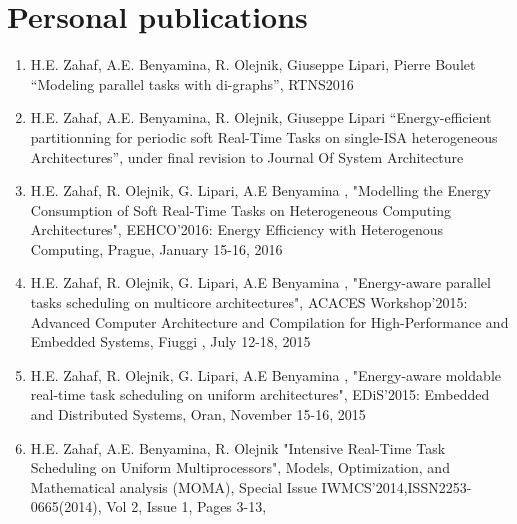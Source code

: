 
\chapter*{Personal publications}
\begin{enumerate}
\item H.E. Zahaf, A.E. Benyamina, R. Olejnik, Giuseppe Lipari, Pierre Boulet
  ``Modeling parallel tasks with di-graphs'', RTNS2016 \cite{me1}

\item H.E. Zahaf, A.E. Benyamina, R. Olejnik, Giuseppe Lipari
  ``Energy-efficient partitionning for periodic soft Real-Time Tasks
  on single-ISA heterogeneous Architectures'', under final revision to
  Journal Of System Architecture \cite{me2}

\item H.E. Zahaf, R. Olejnik, G. Lipari, A.E Benyamina , "Modelling
  the Energy Consumption of Soft Real-Time Tasks on Heterogeneous
  Computing Architectures", EEHCO'2016: Energy Efficiency with
  Heterogenous Computing, Prague, January 15-16, 2016\cite{me3}

\item H.E. Zahaf, R. Olejnik, G. Lipari, A.E Benyamina , "Energy-aware
  parallel tasks scheduling on multicore architectures", ACACES
  Workshop'2015: Advanced Computer Architecture and Compilation for
  High-Performance and Embedded Systems, Fiuggi , July 12-18, 2015
  \cite{me4}
  
\item H.E. Zahaf, R. Olejnik, G. Lipari, A.E Benyamina , "Energy-aware
  moldable real-time task scheduling on uniform architectures",
  EDiS'2015: Embedded and Distributed Systems, Oran, November 15-16,
  2015 \cite{me5}
    
\item H.E. Zahaf, A.E. Benyamina, R. Olejnik "Intensive Real-Time Task
  Scheduling on Uniform Multiprocessors", Models, Optimization, and
  Mathematical analysis (MOMA), Special Issue
  IWMCS'2014,ISSN2253-0665(2014), Vol 2, Issue 1, Pages 3-13,\cite{me6}
  

\end{enumerate}
